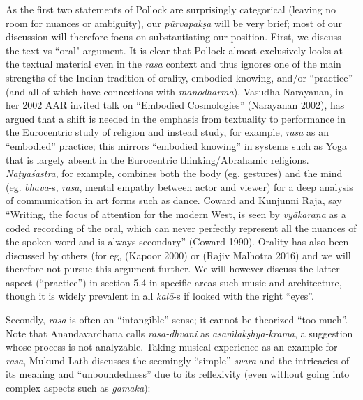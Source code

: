 As the first two statements of Pollock are surprisingly categorical (leaving no room for nuances or ambiguity), our \textsl{pūrvapakṣa} will be very brief; most of our discussion will therefore focus on substantiating our position. First, we discuss the text vs “oral" argument. It is clear that Pollock almost exclusively looks at the textual material even in the \textsl{rasa} context and thus ignores one of the main strengths of the Indian tradition of orality, embodied knowing, and/or “practice” (and all of which have connections with \textsl{manodharma}). Vasudha Narayanan, in her 2002 AAR invited talk on “Embodied Cosmologies” (Narayanan 2002), has argued that a shift is needed in the emphasis from textuality to performance in the Eurocentric study of religion and instead study, for example, \textsl{rasa} as an “embodied” practice; this mirrors “embodied knowing” in systems such as Yoga that is largely absent in the Eurocentric thinking/Abrahamic religions. \textsl{Nāṭyaśāstra}, for example, combines both the body (eg. gestures) and the mind (eg. \textsl{bhāva}-s, \textsl{rasa}, mental empathy between actor and viewer) for a deep analysis of communication in art forms such as dance. Coward and Kunjunni Raja, say “Writing, the focus of attention for the modern West, is seen by \textsl{vyākaraṇa} as a coded recording of the oral, which can never perfectly represent all the nuances of the spoken word and is always secondary” (Coward 1990). Orality has also been discussed by others (for eg, (Kapoor 2000) or (Rajiv Malhotra 2016) and we will therefore not pursue this argument further. We will however discuss the latter aspect (“practice”) in section 5.4 in specific areas such music and architecture, though it is widely prevalent in all \textsl{kalā}-s if looked with the right “eyes”.

\newpage

Secondly, \textsl{rasa} is often an “intangible” sense; it cannot be theorized “too much”. Note that Ānandavardhana calls \textsl{rasa-dhvani} as \textsl{asaṁlakṣhya-krama}, a suggestion whose process is not analyzable. Taking musical experience as an example for \textsl{rasa}, Mukund Lath discusses the seemingly “simple” \textsl{svara} and the intricacies of its meaning and “unboundedness” due to its reflexivity (even without going into complex aspects such as \textsl{gamaka}):

